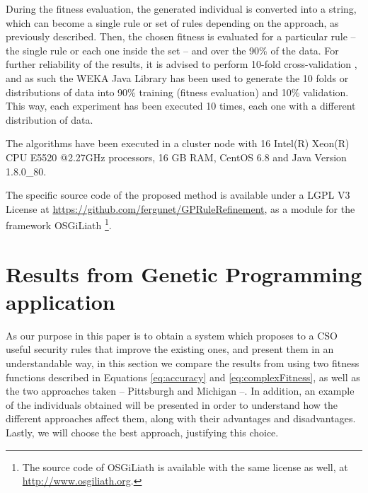 \documentclass[runningheads]{llncs}
\begin{document}
During the fitness evaluation, the generated individual is converted
into a string, which can become a single rule or set of rules
depending on the approach, as previously described. %
Then, the chosen fitness is evaluated for a particular rule -- the single rule or each one inside the set -- and over the 90\% of the data.
For further reliability of the results, it is advised to perform
10-fold cross-validation \cite{kohavi1995study}, and as such the WEKA %
Java Library \cite{HallWEKA09} has been used to generate the 10 folds
or distributions of data into 90\% training (fitness evaluation) and
10\% validation. This way, each experiment has been executed 10 times,
each one with a different distribution of data.

The algorithms have been executed in a cluster node with 16 Intel(R) Xeon(R) CPU E5520
@2.27GHz processors, 16 GB RAM, CentOS 6.8 and Java Version 1.8.0\_80.

The specific source code of the proposed method is available under a LGPL V3 License 
at \url{https://github.com/fergunet/GPRuleRefinement}, as a module for 
the framework OSGiLiath \cite{DBLP:journals/soco/Garcia-SanchezGCAG13} 
\footnote{The source code of OSGiLiath is available with the same
  license  as well, at \url{http://www.osgiliath.org}.}.

\section{Results from Genetic Programming application} 
\label{sec:gp}

As our purpose in this paper is to obtain a system which proposes to a CSO useful security rules that improve the existing ones, and present them in an understandable way, in this section we compare the results from using two fitness functions
described in Equations \ref{eq:accuracy} and \ref{eq:complexFitness}, as well as the two approaches taken -- Pittsburgh and Michigan --. In addition, an example of the individuals obtained will be presented in order to understand how the different approaches affect them, along with
their advantages and disadvantages.
Lastly, we will choose the best
approach, justifying this choice. 
\end{document}
